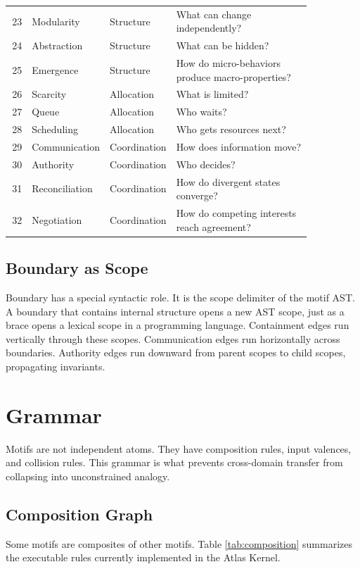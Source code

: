\documentclass[11pt]{article}
\begin{document}
\begin{longtable}{rL{0.2\linewidth}L{0.2\linewidth}L{0.45\linewidth}}
23 & Modularity & Structure & What can change independently? \\
24 & Abstraction & Structure & What can be hidden? \\
25 & Emergence & Structure & How do micro-behaviors produce macro-properties? \\
26 & Scarcity & Allocation & What is limited? \\
27 & Queue & Allocation & Who waits? \\
28 & Scheduling & Allocation & Who gets resources next? \\
29 & Communication & Coordination & How does information move? \\
30 & Authority & Coordination & Who decides? \\
31 & Reconciliation & Coordination & How do divergent states converge? \\
32 & Negotiation & Coordination & How do competing interests reach agreement? \\
\bottomrule
\end{longtable}

\subsection{Boundary as Scope}

Boundary has a special syntactic role. It is the scope delimiter of the motif
AST. A boundary that contains internal structure opens a new AST scope, just as
a brace opens a lexical scope in a programming language. Containment edges run
vertically through these scopes. Communication edges run horizontally across
boundaries. Authority edges run downward from parent scopes to child scopes,
propagating invariants.

\section{Grammar}

Motifs are not independent atoms. They have composition rules, input valences,
and collision rules. This grammar is what prevents cross-domain transfer from
collapsing into unconstrained analogy.

\subsection{Composition Graph}

Some motifs are composites of other motifs. Table \ref{tab:composition}
summarizes the executable rules currently implemented in the Atlas Kernel.
\end{document}
